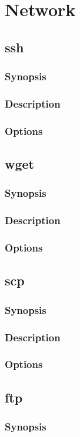 \documentclass[a4paper, 10pt, onecolumn, openright, oneside]{book}
\begin{document}
	\chapter{Network}
		\section{ssh}
			\subsection{Synopsis}
			\subsection{Description}
			\subsection{Options}
		\section{wget}
			\subsection{Synopsis}
			\subsection{Description}
			\subsection{Options}
		\section{scp}
			\subsection{Synopsis}
			\subsection{Description}
			\subsection{Options}
		\section{ftp}
			\subsection{Synopsis}
\end{document}
